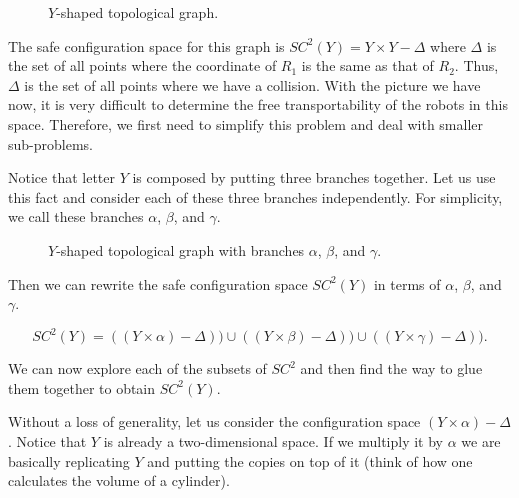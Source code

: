 \documentclass[12pt]{article}
\theoremstyle{definition}
\begin{document}
\begin{figure}[H]
    \centering
    \caption*{$Y$-shaped topological graph.}
\end{figure}

The safe configuration space for this graph is $SC^2(Y) = Y \times Y - \Delta$ where $\Delta$ is the set
of all points where the coordinate of $R_1$ is the same as that of $R_2$. Thus, $\Delta$ is the set of all
points where we have a collision. With the picture we have now, it is very difficult to determine the free
transportability of the robots in this space. Therefore, we first need to simplify this problem and deal
with smaller sub-problems.

\bigskip

Notice that letter $Y$ is composed by putting three branches together. Let us use this fact and consider
each of these three branches independently. For simplicity, we call these branches $\alpha$, $\beta$, and $\gamma$.

\begin{figure}[H]
    \centering
    \caption*{$Y$-shaped topological graph with branches $\alpha$, $\beta$, and $\gamma$.}
\end{figure}

Then we can rewrite the safe configuration space $SC^2(Y)$ in terms of $\alpha$, $\beta$, and $\gamma$.

$$SC^2(Y) = ((Y \times \alpha) - \Delta)) \cup ((Y \times \beta) - \Delta)) \cup ((Y \times \gamma) - \Delta)).$$

We can now explore each of the subsets of $SC^2$ and then find the way to glue them together to obtain $SC^2(Y)$.

\bigskip

Without a loss of generality, let us consider the configuration space $(Y \times \alpha) - \Delta$.
Notice that $Y$ is already a two-dimensional space. If we multiply it by $\alpha$ we are basically
replicating $Y$ and putting the copies on top of it (think of how one calculates the volume of a cylinder).
\end{document}

